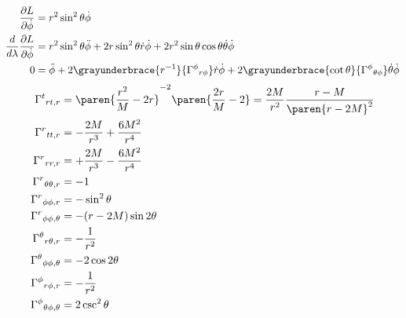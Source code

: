 \documentclass{scrartcl}
\begin{document}
\begin{align*}
  \frac{\partial L}{\partial \dot \phi} &= r^2\sin^2\theta\dot \phi \\
  \frac{d}{d\lambda}\frac{\partial L}{\partial \dot \phi} &= r^2\sin^2\theta\ddot\phi + 2r\sin^2\theta\dot r \dot \phi +2 r^2\sin\theta\cos\theta \dot\theta\dot\phi \\
  0&= \ddot \phi +2\grayunderbrace{ r^{-1}}{{\Gamma^\phi}_{r\phi}} \dot r\dot \phi + 2\grayunderbrace{\cot\theta}{{\Gamma^\phi}_{\theta\phi}} \dot\theta\dot\phi
\end{align*}
\begin{align*}
  {\Gamma^t}_{rt,r} &= \paren{\frac{r^2}M - 2r}^{-2}\paren{\frac{2r}{M}-2} =  \frac{2M}{r^2}\frac{r-M}{\paren{r-2M}^2} \\
  {\Gamma^r}_{tt,r} &= -\frac{2M}{r^3} +  \frac{6M^2}{r^4} \\
  {\Gamma^r}_{rr,r} &= +\frac{2M}{r^3} -  \frac{6M^2}{r^4} \\
  {\Gamma^r}_{\theta\theta,r} &= -1 \\
  {\Gamma^r}_{\phi\phi,r} &= -\sin^2\theta \\
  {\Gamma^r}_{\phi\phi,\theta} &= -(r-2M)\sin2\theta\\
  {\Gamma^\theta}_{r\theta,r} &= -\frac{1}{r^2} \\
  {\Gamma^\theta}_{\phi\phi,\theta}&= -2\cos2\theta \\
  {\Gamma^\phi}_{r\phi,r}&=-\frac{1}{r^2} \\
  {\Gamma^\phi}_{\theta\phi,\theta}&= 2\csc^2\theta
\end{align*}
\end{document}
